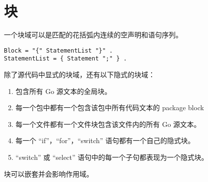 \chapter{块}
一个块域可以是匹配的花括弧内连续的空声明和语句序列。
\begin{lstlisting}[style=EBNF]
Block = "{" StatementList "}" .
StatementList = { Statement ";" } .
\end{lstlisting}

除了源代码中显式的块域，还有以下隐式的块域：
\begin{enumerate}
\item 包含所有 Go 源文本的全局块。
\item 每一个包中都有一个包含该包中所有代码文本的 package block
\item 每一个文件都有一个文件块包含该文件内的所有 Go 源文本。
\item 每一个 ``if''，``for''，``switch'' 语句都有一个自己的隐式块。
\item  ``switch'' 或 ``select'' 语句中的每一个子句都表现为一个隐式块。
\end{enumerate}
块可以嵌套并会影响作用域。